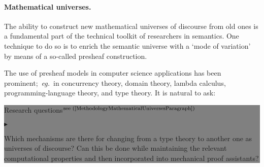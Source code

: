 \documentclass[11pt,twocolumn]{article}
\newenvironment{btritemize}
  {\begin{list}{\btr}
  {\setlength{\topsep}{2pt}
   \setlength{\partopsep}{2pt}
   \setlength{\itemsep}{2.5pt}
   \setlength{\parsep}{2.5pt}
   \setlength{\leftmargin}{1em}
   \setlength{\labelwidth}{.5em}}}
  {\end{list}}
\newcommand{\mytextsf}[1]{\textsf{\small #1}}
\newcommand{\hideMathematicalUniverses}[1]{#1}
\newcommand{\eg}{\emph{eg.}}
\newcommand{\btr}{$\blacktriangleright$}
\newcommand{\reqpsize}{8.113395cm}%
\newcommand{\reqs}[2]{\begin{center}\colorbox{grey}{\begin{minipage}{\reqpsize}
  \mytextsf{Research questions}\hfill$^{\mbox{\scriptsize see #1 }}$\\[-5.5mm]
  \begin{btritemize}
  \item #2
  \end{btritemize}
\end{minipage}}\end{center}}
\newcommand{\Set}{{\boldsymbol{\mathscr S}}}
\newcommand{\scat}[1]{\mathbb{#1}}
\begin{document}
\hideMathematicalUniverses{
\paragraph*{Mathematical universes.}
\label{MathematicalUniversesParagraph}

The ability to construct new mathematical universes of discourse from old ones
is a fundamental part of the technical toolkit of researchers in semantics. 
%
One technique to do so is to enrich the semantic universe with a `mode of
variation' by means of a so-called presheaf construction.  


The use of presheaf models in computer science applications has been
prominent;~\eg~in 
concurrency theory, %
domain theory, %
lambda calculus, %
programming-language theory, %
and type theory. %
%
It is %
natural to ask:
\reqs{(\ref{MethodologyMathematicalUniversesParagraph})}
  {Which mechanisms are there for changing from a type theory to another one
    as universes of discourse? 
%
    Can this be done while maintaining the relevant computational properties
    and then incorporated into mechanical proof assistants?}


}
\end{document}
